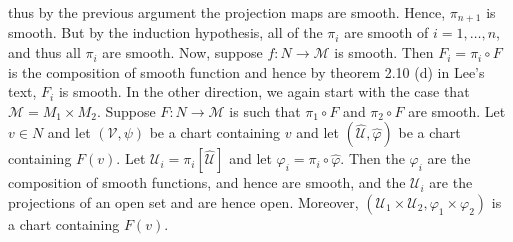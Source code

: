 \documentclass{article}                                                        %
\begin{document}
\begin{solution}
            thus by the previous argument the projection maps are smooth. Hence,
            $\pi_{n+1}$ is smooth. But by the induction hypothesis, all of the
            $\pi_{i}$ are smooth of $i=1,\dots,n$, and thus all $\pi_{i}$ are
            smooth. Now, suppose $f:N\rightarrow\mathcal{M}$ is smooth. Then
            $F_{i}=\pi_{i}\circ{F}$ is the composition of smooth function and
            hence by theorem 2.10 (d) in Lee's text, $F_{i}$ is smooth. In the
            other direction, we again start with the case that
            $\mathcal{M}=M_{1}\times{M}_{2}$. Suppose
            $F:N\rightarrow\mathcal{M}$ is such that $\pi_{1}\circ{F}$ and
            $\pi_{2}\circ{F}$ are smooth. Let $v\in{N}$ and let
            $(\mathcal{V},\psi)$ be a chart containing $v$ and let
            $(\widehat{\mathcal{U}},\widehat{\varphi})$ be a chart containing
            $F(v)$. Let $\mathcal{U}_{i}=\pi_{i}[\widehat{\mathcal{U}}]$ and
            let $\varphi_{i}=\pi_{i}\circ\widehat{\varphi}$. Then the
            $\varphi_{i}$ are the composition of smooth functions, and hence are
            smooth, and the $\mathcal{U}_{i}$ are the projections of an open set
            and are hence open. Moreover,
            $(\mathcal{U}_{1}\times\mathcal{U}_{2},%
             \varphi_{1}\times\varphi_{2})$ is a chart containing $F(v)$.
        \end{solution}
\end{document}
